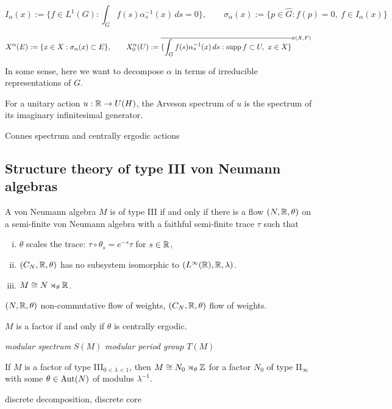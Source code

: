 \documentclass{../../../small}
\begin{document}
\[I_\alpha(x):=\{f\in L^1(G):\int_Gf(s)\alpha_s^{-1}(x)\,ds=0\},\qquad\sigma_\alpha(x):=\{p\in\hat G:\hat f(p)=0,\ f\in I_\alpha(x)\}\]

\[X^\alpha(E):=\{x\in X:\sigma_\alpha(x)\subset E\},\qquad X_0^\alpha(U):=\bar{\{\int_Gf(s)\alpha_s^{-1}(x)\,ds:\supp f\subset U,\ x\in X\}}^{\sigma(X,F)}\]

In some sense, here we want to decompose $\alpha$ in terms of irreducible representations of $G$.

For a unitary action $u:\mathbb{R}\to U(H)$, the Arveson spectrum of $u$ is the spectrum of its imaginary infinitesimal generator.

Connes spectrum and centrally ergodic actions





\subsection{Structure theory of type III von Neumann algebras}

\begin{thm}
A von Neumann algebra $M$ is of type III if and only if there is a flow $(N,\mathbb{R},\theta)$ on a semi-finite von Neumann algebra with a faithful semi-finite trace $\tau$ such that
\begin{enumerate}[(i)]
\item $\theta$ scales the trace: $\tau\circ\theta_s=e^{-s}\tau$ for $s\in\mathbb{R}$,
\item $(C_N,\mathbb{R},\theta)$ has no subsystem isomorphic to $(L^\infty(\mathbb{R}),\mathbb{R},\lambda)$.
\item $M\cong N\rtimes_\theta\mathbb{R}$.
\end{enumerate}
\end{thm}

$(N,\mathbb{R},\theta)$ non-commutative flow of weights,
$(C_N,\mathbb{R},\theta)$ flow of weights.

$M$ is a factor if and only if $\theta$ is centrally ergodic.




\emph{modular spectrum} $S(M)$
\emph{modular period group} $T(M)$


\begin{thm}
If $M$ is a factor of type III$_{0<\lambda<1}$, then $M\cong N_0\rtimes_\theta\mathbb{Z}$ for a factor $N_0$ of type II$_\infty$ with some $\theta\in\operatorname{Aut}(N)$ of modulus $\lambda^{-1}$.
\end{thm}
discrete decomposition, discrete core
\end{document}
